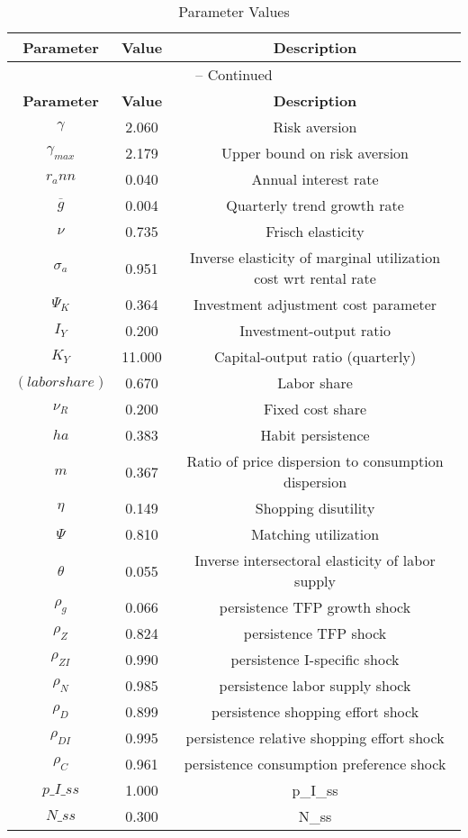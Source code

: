 \begin{center}
\begin{longtable}{ccc}
\caption{Parameter Values}\\%
\toprule%
\multicolumn{1}{c}{\textbf{Parameter}} &
\multicolumn{1}{c}{\textbf{Value}} &
 \multicolumn{1}{c}{\textbf{Description}}\\%
\midrule%
\endfirsthead
\multicolumn{3}{c}{{\tablename} \thetable{} -- Continued}\\%
\midrule%
\multicolumn{1}{c}{\textbf{Parameter}} &
\multicolumn{1}{c}{\textbf{Value}} &
  \multicolumn{1}{c}{\textbf{Description}}\\%
\midrule%
\endhead
${\gamma}$ 	 & 	 2.060 	 & 	 Risk aversion\\
${\gamma_{max}}$ 	 & 	 2.179 	 & 	 Upper bound on risk aversion\\
${r_ann}$ 	 & 	 0.040 	 & 	 Annual interest rate\\
${\overline{g}}$ 	 & 	 0.004 	 & 	 Quarterly trend growth rate\\
$\nu$ 	 & 	 0.735 	 & 	 Frisch elasticity\\
${\sigma_a}$ 	 & 	 0.951 	 & 	 Inverse elasticity of marginal utilization cost wrt rental rate\\
${\Psi_K}$ 	 & 	 0.364 	 & 	 Investment adjustment cost parameter\\
${I_Y}$ 	 & 	 0.200 	 & 	 Investment-output ratio\\
${K_Y}$ 	 & 	 11.000 	 & 	 Capital-output ratio (quarterly)\\
$(labor share)$ 	 & 	 0.670 	 & 	 Labor share\\
${\nu_R}$ 	 & 	 0.200 	 & 	 Fixed cost share\\
${ha}$ 	 & 	 0.383 	 & 	 Habit persistence\\
${m}$ 	 & 	 0.367 	 & 	 Ratio of price dispersion to consumption dispersion\\
${\eta}$ 	 & 	 0.149 	 & 	 Shopping disutility\\
${\Psi}$ 	 & 	 0.810 	 & 	 Matching utilization\\
${\theta}$ 	 & 	 0.055 	 & 	 Inverse intersectoral elasticity of labor supply\\
${\rho_g}$ 	 & 	 0.066 	 & 	 persistence TFP growth shock\\
${\rho_Z}$ 	 & 	 0.824 	 & 	 persistence TFP shock\\
${\rho_{ZI}}$ 	 & 	 0.990 	 & 	 persistence I-specific shock\\
${\rho_N}$ 	 & 	 0.985 	 & 	 persistence labor supply shock\\
${\rho_D}$ 	 & 	 0.899 	 & 	 persistence shopping effort shock\\
${\rho_{DI}}$ 	 & 	 0.995 	 & 	 persistence relative shopping effort shock\\
${\rho_C}$ 	 & 	 0.961 	 & 	 persistence consumption preference shock\\
$p\_I\_ss$ 	 & 	 1.000 	 & 	 p\_I\_ss\\
$N\_ss$ 	 & 	 0.300 	 & 	 N\_ss\\
\bottomrule%
\end{longtable}
\end{center}
